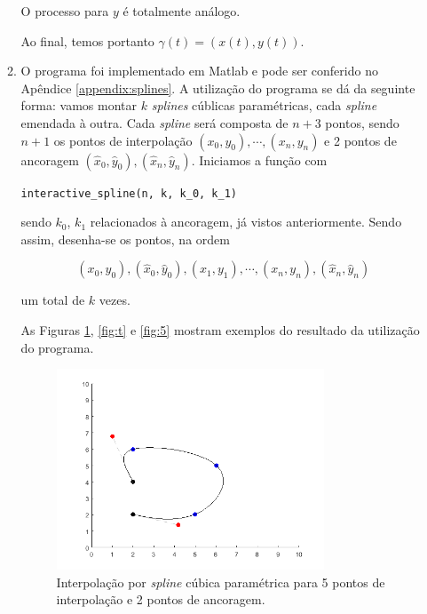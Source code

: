 \documentclass{article}
\begin{document}
\begin{enumerate}
\begin{enumerate}
                    O processo para $y$ é totalmente análogo.

                    Ao final, temos portanto $\gamma(t) = (x(t), y(t))$.

                \item O programa foi implementado em Matlab e pode ser conferido no Apêndice
                    \ref{appendix:splines}.
                    A utilização do programa se dá da seguinte forma:
                    vamos montar $k$ \textit{splines} cúblicas paramétricas, cada \textit{spline}
                    emendada à outra. Cada \textit{spline} será composta de $n + 3$ pontos,
                    sendo $n + 1$ os pontos de interpolação $(x_0, y_0), \cdots, (x_n, y_n)$
                    e 2 pontos de ancoragem $(\hat{x}_0, \hat{y}_0), (\hat{x}_n, \hat{y}_n)$.
                    Iniciamos a função com 
                    
                    \begin{center}
                        \lstinline{interactive_spline(n, k, k_0, k_1)}
                    \end{center}

                    sendo $k_0$, $k_1$ relacionados à ancoragem, já vistos anteriormente.
                    Sendo assim, desenha-se os pontos, na ordem

                    $$(x_0, y_0), (\hat{x}_0, \hat{y}_0), (x_1, y_1), \cdots, (x_n, y_n), (\hat{x}_n, \hat{y}_n)$$

                    um total de $k$ vezes.

                    As Figuras \ref{fig:abcde}, \ref{fig:t} e \ref{fig:5} mostram
                    exemplos do resultado da utilização do programa.

                    \begin{figure}[!h]
                        \centering
                        \includegraphics[width=0.8\textwidth]{abcde.png}
                        \caption{Interpolação por \textit{spline} cúbica paramétrica
                        para 5 pontos de interpolação e 2 pontos de ancoragem.}
                        \label{fig:abcde}
                    \end{figure}


\end{enumerate}
\end{enumerate}
\end{document}
